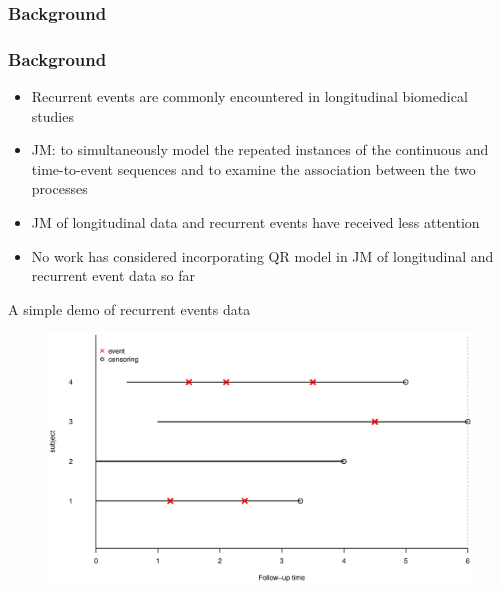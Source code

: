 \documentclass[10pt]{beamer}
\begin{document}
\subsubsection{Background} %
\begin{frame}[allowframebreaks]
\frametitle{Background}
  \begin{itemize}
    \item Recurrent events are commonly encountered in longitudinal biomedical studies
    \item JM: to simultaneously model the repeated instances of the continuous and time-to-event sequences and to examine the association between the two processes
    \item JM of longitudinal data and recurrent events have received less attention
    \item No work has considered incorporating QR model in JM of longitudinal and recurrent event data so far
  \end{itemize}

  \framebreak
  A simple demo of recurrent events data
  \begin{figure}[H]
  \includegraphics[width=\textwidth]{figures/rec_evt_demo.eps}
  \end{figure}
\end{frame}
\end{document}
